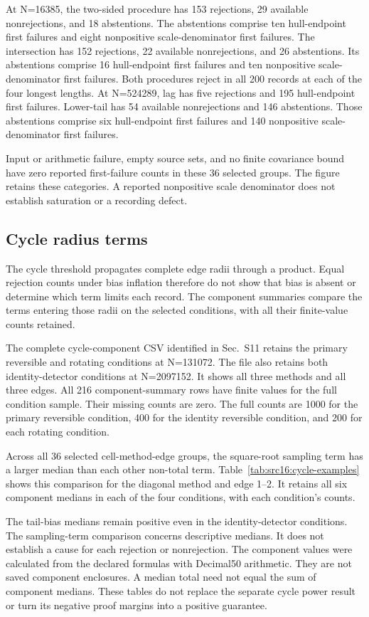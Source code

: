 At N=16385, the two-sided procedure has 153 rejections, 29 available nonrejections, and 18 abstentions. The abstentions comprise ten hull-endpoint first failures and eight nonpositive scale-denominator first failures. The intersection has 152 rejections, 22 available nonrejections, and 26 abstentions. Its abstentions comprise 16 hull-endpoint first failures and ten nonpositive scale-denominator first failures. Both procedures reject in all 200 records at each of the four longest lengths. At N=524289, lag has five rejections and 195 hull-endpoint first failures. Lower-tail has 54 available nonrejections and 146 abstentions. Those abstentions comprise six hull-endpoint first failures and 140 nonpositive scale-denominator first failures.

Input or arithmetic failure, empty source sets, and no finite covariance bound have zero reported first-failure counts in these 36 selected groups. The figure retains these categories. A reported nonpositive scale denominator does not establish saturation or a recording defect.

\subsection{Cycle radius terms}\label{sec:src16:cycle-terms}

The cycle threshold propagates complete edge radii through a product. Equal rejection counts under bias inflation therefore do not show that bias is absent or determine which term limits each record. The component summaries compare the terms entering those radii on the selected conditions, with all their finite-value counts retained.

The complete cycle-component CSV identified in Sec.~S11 retains the primary reversible and rotating conditions at N=131072. The file also retains both identity-detector conditions at N=2097152. It shows all three methods and all three edges. All 216 component-summary rows have finite values for the full condition sample. Their missing counts are zero. The full counts are 1000 for the primary reversible condition, 400 for the identity reversible condition, and 200 for each rotating condition.

Across all 36 selected cell-method-edge groups, the square-root sampling term has a larger median than each other non-total term. Table~\ref{tab:src16:cycle-examples} shows this comparison for the diagonal method and edge 1--2. It retains all six component medians in each of the four conditions, with each condition's counts.



The tail-bias medians remain positive even in the identity-detector conditions. The sampling-term comparison concerns descriptive medians. It does not establish a cause for each rejection or nonrejection. The component values were calculated from the declared formulas with Decimal50 arithmetic. They are not saved component enclosures. A median total need not equal the sum of component medians. These tables do not replace the separate cycle power result or turn its negative proof margins into a positive guarantee.
